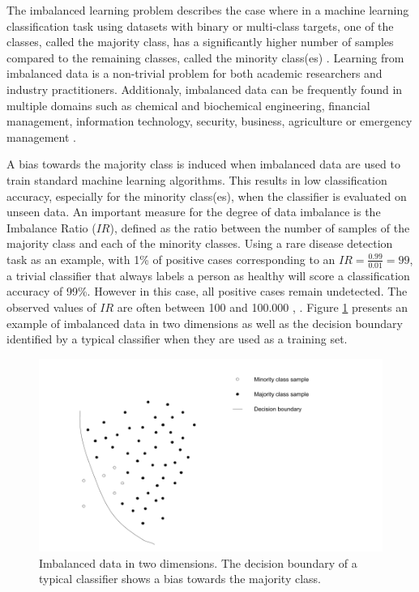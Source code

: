 \documentclass[preprint,12pt, a4paper]{elsarticle}
\begin{document}
The imbalanced learning problem describes the case where in a machine learning classification task using datasets with binary or multi-class targets, one of the classes, called the majority class, has a significantly higher number of samples compared to the remaining classes, called the minority class(es) \cite{Chawla2003}. Learning from imbalanced data is a non-trivial problem for both academic researchers and industry practitioners. Additionaly, imbalanced data can be frequently found in multiple domains such as chemical and biochemical engineering, financial management, information technology, security, business, agriculture or emergency management \cite{Haixiang2017}.

A bias towards the majority class is induced when imbalanced data are used to train standard machine learning algorithms. This results in low classification accuracy, especially for the minority class(es), when the classifier is evaluated on unseen data. An important measure for the degree of data imbalance is the Imbalance Ratio ($IR$), defined as the ratio between the number of samples of the majority class and each of the minority classes. Using a rare disease detection task as an example, with 1\% of positive cases corresponding to an $IR=\frac{0.99}{0.01}=99$, a trivial classifier that always labels a person as healthy will score a classification accuracy of 99\%. However in this case, all positive cases remain undetected. The observed values of $IR$ are often between 100 and 100.000 \cite{Chawla2002}, \cite{Barua2014}. Figure \ref{fig:imbalanced} presents an example of imbalanced data in two dimensions as well as the decision boundary identified by a typical classifier when they are used as a training set.

\begin{figure}[H]
	\centering
    \includegraphics[width=14cm, keepaspectratio]{../analysis/imbalanced_problem}
    \caption{Imbalanced data in two dimensions. The decision boundary of a typical classifier shows a bias towards the majority class.}
    \label{fig:imbalanced}
\end{figure}
\end{document}
